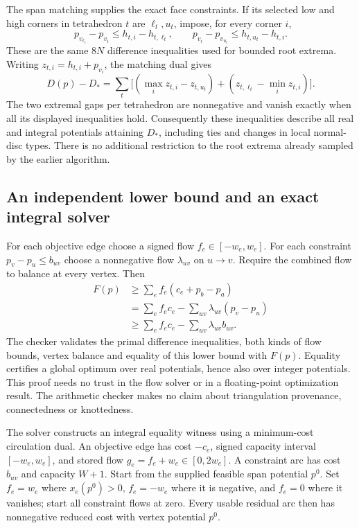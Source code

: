 The span matching supplies the exact face constraints. If its selected low
and high corners in tetrahedron $t$ are $\ell_t,u_t$, impose, for every corner
$i$,
\[
 p_{v_{\ell_t}}-p_{v_i}\leq h_{t,i}-h_{t,\ell_t},\qquad
 p_{v_i}-p_{v_{u_t}}\leq h_{t,u_t}-h_{t,i}.
\]
These are the same $8N$ difference inequalities used for bounded root
extrema. Writing $z_{t,i}=h_{t,i}+p_{v_i}$, the matching dual gives
\[
 D(p)-D_*=\sum_t\bigl[(\max_i z_{t,i}-z_{t,u_t})
                         +(z_{t,\ell_t}-\min_i z_{t,i})\bigr].
\]
The two extremal gaps per tetrahedron are nonnegative and vanish exactly
when all its displayed inequalities hold. Consequently these inequalities
describe all real and integral potentials attaining $D_*$,
including ties and changes in local normal-disc types. There is no additional
restriction to the root extrema already sampled by the earlier algorithm.

\subsection{An independent lower bound and an exact integral solver}

For each objective edge choose a signed flow $f_e\in[-w_e,w_e]$. For each
constraint $p_v-p_u\leq b_{uv}$ choose a nonnegative flow $\lambda_{uv}$ on
$u\to v$. Require the combined flow to balance at every vertex. Then
\[
\begin{split}
 F(p)&\geq\sum_e f_e(c_e+p_b-p_a)\\
     &=\sum_e f_ec_e-\sum_{uv}\lambda_{uv}(p_v-p_u)\\
     &\geq\sum_e f_ec_e-\sum_{uv}\lambda_{uv}b_{uv}.
\end{split}
\]
The checker validates the primal difference inequalities, both kinds of
flow bounds, vertex balance and equality of this lower bound with $F(p)$.
Equality certifies a global optimum over real potentials, hence also over
integer potentials. This proof needs no trust in the flow solver or in a
floating-point optimization result. The arithmetic checker makes no claim
about triangulation provenance, connectedness or knottedness.

The solver constructs an integral equality witness using a minimum-cost
circulation dual. An objective edge has cost $-c_e$, signed capacity interval
$[-w_e,w_e]$, and stored flow $g_e=f_e+w_e\in[0,2w_e]$. A constraint arc has
cost $b_{uv}$ and capacity $W+1$. Start from the supplied feasible span
potential $p^0$. Set $f_e=w_e$ where $x_e(p^0)>0$, $f_e=-w_e$ where it is
negative, and $f_e=0$ where it vanishes; start all constraint flows at zero.
Every usable residual arc then has nonnegative reduced cost with vertex
potential $p^0$.


